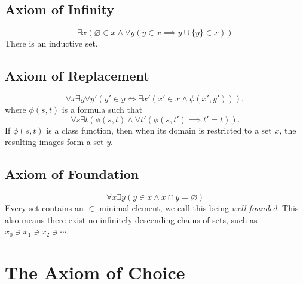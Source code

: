 \documentclass[../../main.tex]{subfiles}
\begin{document}
\subsection{Axiom of Infinity} \label{ZF7}
$$\exists x \left(\varnothing \in x \wedge \forall y \left(y \in x \implies y \cup \{y\} \in x \right)\right)$$
There is an inductive set.

\subsection{Axiom of Replacement}
$$\forall x \exists y \forall y' \left(y' \in y \iff \exists x' \left(x' \in x \wedge \phi(x', y')\right)\right),$$
where $\phi(s, t)$ is a formula such that 
$$\forall s \exists t \left(\phi(s, t) \wedge \forall t' \left(\phi(s, t') \implies t' = t\right)\right).$$
If $\phi(s, t)$ is a class function, then when its domain is restricted to a set $x$, the resulting images form a set $y$.

\subsection{Axiom of Foundation}
$$\forall x \exists y \left(y \in x \wedge x \cap y = \varnothing \right)$$
Every set contains an $\in$-minimal element, we call this being \textit{well-founded}.\cite[p.92]{Gol17}
This also means there exist no infinitely descending chains of sets, such as $x_0 \ni x_1 \ni x_2 \ni \cdots$.\cite[Theorem 4.3, p.95]{Gol17}

\section{The Axiom of Choice}
\end{document}
